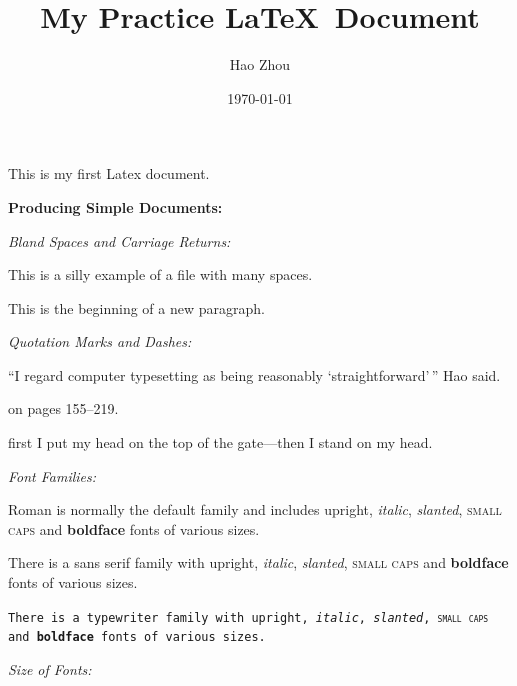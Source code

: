 \documentclass[12pt]{article}
\begin{document}
\tableofcontents

\title{My Practice \LaTeX\ Document}
\author{Hao Zhou}
\date{\today}
\maketitle

This is my first Latex document. \\

\bigbreak 
\noindent
\begin{Large}\textbf{Producing Simple Documents:}\end{Large} 
\bigbreak

\noindent
\begin{large}\textit{Bland Spaces and Carriage Returns:}\end{large}

This is 
	a 
		silly
  example	of	a
file with many spaces.

					This is the beginning
of a new paragraph. \\

\noindent
\begin{large}\textit{Quotation Marks and Dashes:}\end{large}

``I regard computer typesetting as being reasonably `straightforward'\,'' Hao said.

on pages 155--219.

first I put my head on the top of the gate---then I stand on my head. \bigbreak

\noindent
\begin{large}\textit{Font Families:}\end{large}

\textrm{Roman is normally the default family and includes \textup{upright}, \textit{italic}, \textsl{slanted}, \textsc{small caps} and \textbf{boldface} fonts of various sizes.}

\textsf{There is a sans serif family with \textup{upright}, \textit{italic}, \textsl{slanted}, \textsc{small caps} and \textbf{boldface} fonts of various sizes.}

\texttt{There is a typewriter family with \textup{upright}, \textit{italic}, \textsl{slanted}, \textsc{small caps} and \textbf{boldface} fonts of various sizes.} \\

\noindent
\begin{large}\textit{Size of Fonts:}\end{large}
\end{document}
